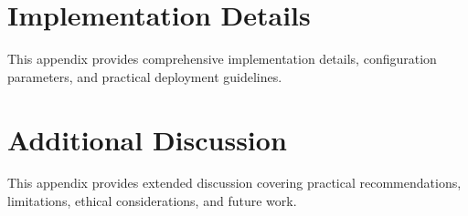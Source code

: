 \documentclass[10pt,letterpaper]{article}
\begin{document}

\section{Implementation Details}
\label{appendix:implementation_details}

This appendix provides comprehensive implementation details, configuration parameters, and practical deployment guidelines.








\section{Additional Discussion}
\label{appendix:additional_discussion}

This appendix provides extended discussion covering practical recommendations, limitations, ethical considerations, and future work.





% 

% 
% 

\end{document}
